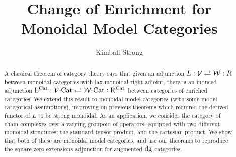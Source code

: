 \documentclass[12pt]{amsart}
\begin{document}
\title{Change of Enrichment for Monoidal Model Categories}
\author{Kimball Strong}
\address{Department of Mathematics, Cornell University, Ithaca, NY 14853}
\date{}
\begin{abstract}
	A classical theorem of category theory says that given an adjunction $L: \mathcal{V} \rightleftarrows \mathcal{W}: R$ between monoidal categories with lax monoidal right adjoint, there is an induced adjunction $\mathrm{L}^{\mathrm{Cat}}: \mathcal{V}\text{-}\mathrm{Cat} \rightleftarrows \mathcal{W}\text{-}\mathrm{Cat} : \mathrm{R}^{\mathrm{Cat}}$ between categories of enriched categories.
	We extend this result to monoidal model categories (with some model categorical assumptions), improving on previous theorems which required the derived functor of $L$ to be strong monoidal.
	As an application, we consider the category of chain complexes over a varying groupoid of operators, equipped with two different monoidal structures: the standard tensor product, and the cartesian product. 
	We show that both of these are monoidal model categories, and use our theorems to reproduce the square-zero extensions adjunction for augmented $\mathrm{dg}$-categories.
\end{abstract}
\maketitle
\tableofcontents
\end{document}
